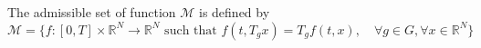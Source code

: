 \documentclass[a4paper,10pt]{article}
\theoremstyle{definition} %
\theoremstyle{definition} %
\theoremstyle{definition} %
\theoremstyle{definition} %
\newcommand{\R}{\mathbb{R}}
\newcommand{\0}{\boldsymbol{0}}
\begin{document}
The admissible set of function $\mathcal{M}$ is defined by
\begin{equation*}
    \mathcal{M} = \{f:[0,T]\times \R^N \rightarrow \R^N \text{ such that } f(t,T_g x) = T_g f(t,x), \quad \forall g\in G,\forall x\in \R^N \}
\end{equation*}
\end{document}
